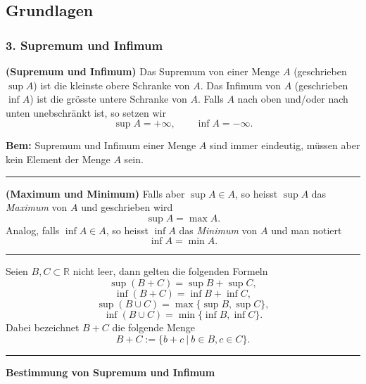 \documentclass[a4paper,landscape,8pt]{extarticle}
\newcommand{\R}{\mathbb{R}}
\newcommand{\setsep}{\ \vert \ }
\newcommand{\sep}{\vspace{5pt}\noindent\hrule\vspace{5pt}}
\newcommand{\Bem}{\textbf{Bem: }}
\begin{document}
\setlength{\belowdisplayskip}{4pt} \setlength{\belowdisplayshortskip}{4pt}
\setlength{\abovedisplayskip}{4pt} \setlength{\abovedisplayshortskip}{4pt}

\allowdisplaybreaks

\begin{multicols*}{4}
\raggedcolumns


\setcounter{tocdepth}{2}
\tableofcontents

\part{Grundlagen}
 
\section{3. Supremum und Infimum}

\Def \textbf{(Supremum und Infimum)} Das Supremum von einer Menge $A$
(geschrieben $\sup A$) ist die kleinste obere Schranke von $A$. Das Infimum von
$A$ (geschrieben $\inf A$) ist die grösste untere Schranke von $A$. Falls $A$
nach oben und/oder nach unten unebschränkt ist, so setzen wir
\[
\sup A = +\infty, \qquad \inf A = -\infty.
\]

\Bem Supremum und Infimum einer Menge $A$ sind immer eindeutig, müssen aber kein
Element der Menge $A$ sein.

\sep

\Def \textbf{(Maximum und Minimum)} Falls aber $\sup A \in A$, so heisst $\sup
A$ das \emph{Maximum} von $A$ und geschrieben wird
\[
\sup A = \max A.
\]
Analog, falls $\inf A \in A$, so heisst $\inf A$ das \emph{Minimum} von $A$ und
man notiert
\[
\inf A = \min A.
\]

\sep


Seien $B,C\subset\R$ nicht leer, dann gelten die folgenden Formeln
\[
\sup(B+C) = \sup B + \sup C,
\]
\[
\inf(B+C) = \inf B + \inf C,
\]
\[
\sup(B\cup C) = \max \{\sup B, \sup C\},
\]
\[
\inf(B\cup C)=\min\{\inf B,\inf C\}.
\]
Dabei bezeichnet $B+C$ die folgende Menge
\[
B+C := \{b+c \setsep b\in B, c\in C\}.
\]


\sep

\textbf{Bestimmung von Supremum und Infimum}


\end{multicols*}
\end{document}
